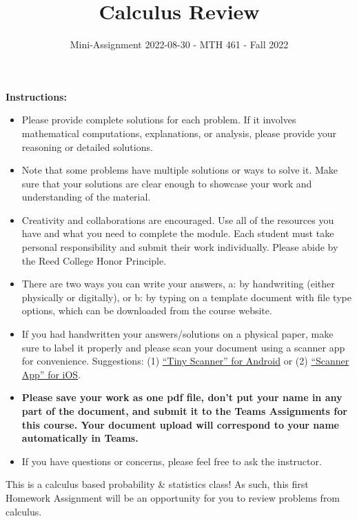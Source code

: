 \documentclass[
]{article}
\title{\textbf{Calculus Review}}
\subtitle{Mini-Assignment 2022-08-30 - MTH 461 - Fall 2022}
\author{}
\date{\vspace{-2.5em}}
\begin{document}
\maketitle

\hfill\break

\textbf{Instructions:}

\begin{itemize}
\item
  Please provide complete solutions for each problem. If it involves mathematical computations, explanations, or analysis, please provide your reasoning or detailed solutions.
\item
  Note that some problems have multiple solutions or ways to solve it. Make sure that your solutions are clear enough to showcase your work and understanding of the material.
\item
  Creativity and collaborations are encouraged. Use all of the resources you have and what you need to complete the module. Each student must take personal responsibility and submit their work individually. Please abide by the Reed College Honor Principle.
\item
  There are two ways you can write your answers, a: by handwriting (either physically or digitally), or b: by typing on a template document with file type options, which can be downloaded from the course website.
\item
  If you had handwritten your answers/solutions on a physical paper, make sure to label it properly and please scan your document using a scanner app for convenience. Suggestions: (1) \href{https://play.google.com/store/apps/details?id=com.appxy.tinyscanner\&hl=en_US\&gl=US}{``Tiny Scanner'' for Android} or (2) \href{https://apps.apple.com/us/app/scanner-app-scan-pdf-document/id595563753}{``Scanner App'' for iOS}.
\item
  \textbf{Please save your work as one pdf file, don't put your name in any part of the document, and submit it to the Teams Assignments for this course. Your document upload will correspond to your name automatically in Teams.}
\item
  If you have questions or concerns, please feel free to ask the instructor.
\end{itemize}

\newpage

This is a calculus based probability \& statistics class! As such, this first Homework Assignment will be an opportunity for you to review problems from calculus.
\end{document}
